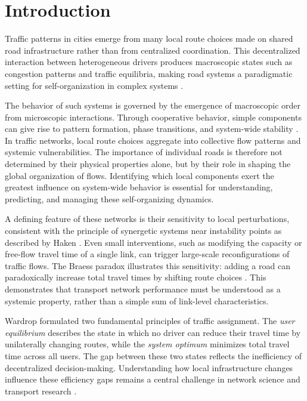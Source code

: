 \documentclass[twocolumn,english,groupedaddress, superscriptaddress,aps,pre,10pt,floatfix]{revtex4-2}
\begin{document}
\maketitle

\section{Introduction}

Traffic patterns in cities emerge from many local route choices made on shared road infrastructure rather than from centralized coordination. This decentralized interaction between heterogeneous drivers produces macroscopic states such as congestion patterns and traffic equilibria, making road systems a paradigmatic setting for self-organization in complex systems \citep{helbing2001traffic, nagel1992cellular, kerner2004physics, chowdhury2000statistical, helbing2009pedestrian}.

The behavior of such systems is governed by the emergence of macroscopic order from microscopic interactions. Through cooperative behavior, simple components can give rise to pattern formation, phase transitions, and system-wide stability \citep{haken1989,camazine2001}. In traffic networks, local route choices aggregate into collective flow patterns and systemic vulnerabilities. The importance of individual roads is therefore not determined by their physical properties alone, but by their role in shaping the global organization of flows. Identifying which local components exert the greatest influence on system-wide behavior is essential for understanding, predicting, and managing these self-organizing dynamics.

A defining feature of these networks is their sensitivity to local perturbations, consistent with the principle of synergetic systems near instability points as described by Haken \cite{haken1989}. Even small interventions, such as modifying the capacity or free-flow travel time of a single link, can trigger large-scale reconfigurations of traffic flows. The Braess paradox illustrates this sensitivity: adding a road can paradoxically increase total travel times by shifting route choices \citep{braess1968paradoxon, roughgarden2002bad, steinberg1983prevalence}. This demonstrates that transport network performance must be understood as a systemic property, rather than a simple sum of link-level characteristics.

Wardrop \citep{wardrop1952road} formulated two fundamental principles of traffic assignment. The \emph{user equilibrium} describes the state in which no driver can reduce their travel time by unilaterally changing routes, while the \emph{system optimum} minimizes total travel time across all users. The gap between these two states reflects the inefficiency of decentralized decision-making. Understanding how local infrastructure changes influence these efficiency gaps remains a central challenge in network science and transport research \citep{roughgarden2002bad, correa2008geometric, youn2008price}.
\end{document}
